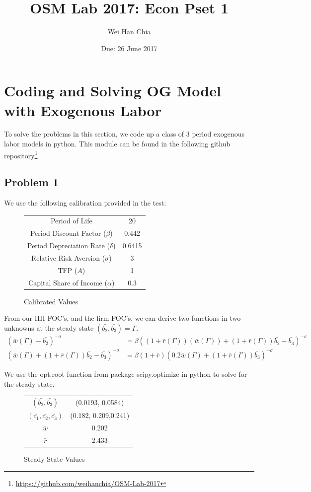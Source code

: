 \documentclass{article}
\begin{document}
	\title{OSM Lab 2017: Econ Pset 1}
	\author{Wei Han Chia}
	\date{Due: 26 June 2017}
	\maketitle
	
	\section*{Coding and Solving OG Model with Exogenous Labor}
	To solve the problems in this section, we code up a class of 3 period exogenous labor models in python. This module can be found in the following github repository\footnote{\hyperlink{https://github.com/weihanchia/OSM-Lab-2017}{https://github.com/weihanchia/OSM-Lab-2017}}
	\subsection*{Problem 1}
	We use the following calibration provided in the test:
	\begin{figure}[!h]
		\centering
		\caption{Calibrated Values}
		\begin{tabular}{c | c}
			Period of Life & 20 \\ 
			Period Discount Factor ($\beta$) & 0.442 \\
			Period Depreciation Rate ($\delta$) & 0.6415 \\
			Relative Risk Aversion ($\sigma$) &  3 \\
			TFP ($A$) & 1 \\
			Capital Share of Income ($\alpha$) & 0.3
		\end{tabular}
	\end{figure}
	
	From our HH FOC's, and the firm FOC's, we can derive two functions in two unknowns at the steady state $(\bar{b_2}, \bar{b_3}) = \Gamma$. 
	\begin{align*}
	(\bar{w}(\Gamma) - \bar{b_2})^{-\sigma} &= \beta((1 + \bar{r}(\Gamma))(\bar{w}(\Gamma)) + (1 + \bar{r}(\Gamma))\bar{b_2} - \bar{b_3})^{-\sigma} \\
	(\bar{w}(\Gamma) + (1 + \bar{r}(\Gamma))\bar{b_2} - \bar{b_3})^{-\sigma} &= \beta (1 + \bar{r})(0.2\bar{w}(\Gamma) + (1 + \bar{r}(\Gamma))\bar{b_3})^{-\sigma}
	\end{align*}
	
	We use the opt.root function from package scipy.optimize in python to solve for the steady state.
	\begin{figure}[!h]
		\centering
		\caption{Steady State Values}
		\begin{tabular}{c | c}
			$(\bar{b_2}, \bar{b_3})$ & (0.0193, 0.0584) \\
			$(\bar{c_1}, \bar{c_2}, \bar{c_3})$ & (0.182, 0.209,0.241) \\
			$\bar{w}$ & 0.202 \\
			$\bar{r}$ & 2.433 
		\end{tabular}
	\end{figure}
	
\end{document}
